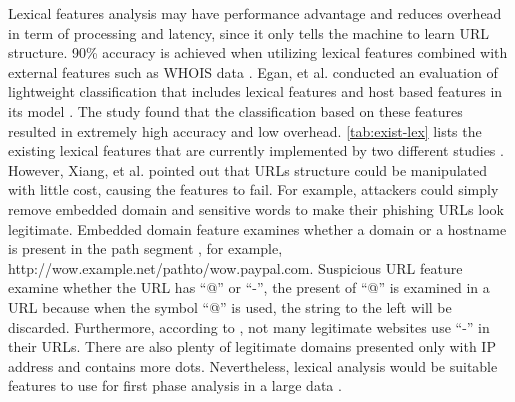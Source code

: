 Lexical features analysis may have performance advantage and reduces
overhead in term of processing and latency, since it only tells the
machine to learn URL structure. 90\% accuracy is achieved when utilizing
lexical features combined with external features such as WHOIS data
\citep{le:2011}. Egan, et al. conducted an evaluation of lightweight
classification that includes lexical features and host based features
in its model \citep{egan:2011}. The study found that the classification
based on these features resulted in extremely high accuracy and low
overhead. \autoref{tab:exist-lex} lists the existing lexical features
that are currently implemented by two different studies \citep{xiang:2011,liu}.
However, Xiang, et al.\citep{xiang:2011} pointed out that URLs structure
could be manipulated with little cost, causing the features to fail.
For example, attackers could simply remove embedded domain and sensitive
words to make their phishing URLs look legitimate. Embedded domain
feature examines whether a domain or a hostname is present in the
path segment \citep{xiang:2011}, for example, http://wow.example.net/pathto/wow.paypal.com.
Suspicious URL feature examine whether the URL has ``@'' or ``-'',
the present of ``@'' is examined in a URL because when the symbol
``@'' is used, the string to the left will be discarded. Furthermore,
according to \citep{xiang:2011}, not many legitimate websites use
``-'' in their URLs. There are also plenty of legitimate domains
presented only with IP address and contains more dots. Nevertheless,
lexical analysis would be suitable features to use for first phase
analysis in a large data \citep{egan:2011}.

